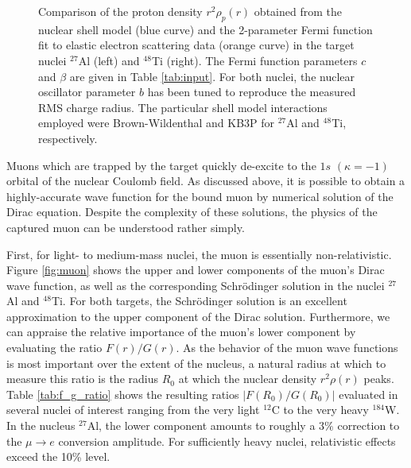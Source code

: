 \documentclass{book}[letterpaper,12pt]
\begin{document}
\begin{figure}
\centering
{}
\caption{Comparison of the proton density $r^2\rho_p(r)$ obtained from the nuclear shell model (blue curve) and the 2-parameter Fermi function fit to elastic electron scattering data (orange curve) in the target nuclei $^{27}$Al (left) and $^{48}$Ti (right). The Fermi function parameters $c$ and $\beta$ are given in Table \ref{tab:input}. For both nuclei, the nuclear oscillator parameter $b$ has been tuned to reproduce the measured RMS charge radius. The particular shell model interactions employed were Brown-Wildenthal and KB3P for $^{27}$Al and $^{48}$Ti, respectively.}
\end{figure}

Muons which are trapped by the target quickly de-excite to the $1s$ $(\kappa=-1)$ orbital of the nuclear Coulomb field. As discussed above, it is possible to obtain a highly-accurate wave function for the bound muon by numerical solution of the Dirac equation. Despite the complexity of these solutions, the physics of the captured muon can be understood rather simply. 

First, for light- to medium-mass nuclei, the muon is essentially non-relativistic. Figure \ref{fig:muon} shows the upper and lower components of the muon's Dirac wave function, as well as the corresponding Schr\"odinger solution in the nuclei $^{27}$Al and $^{48}$Ti. For both targets, the Schr\"odinger solution is an excellent approximation to the upper component of the Dirac solution. Furthermore, we can appraise the relative importance of the muon's lower component by evaluating the ratio $F(r)/G(r)$. As the behavior of the muon wave functions is most important over the extent of the nucleus, a natural radius at which to measure this ratio is the radius $R_0$ at which the nuclear density $r^2\rho(r)$ peaks. Table \ref{tab:f_g_ratio} shows the resulting ratios $|F(R_0)/G(R_0)|$ evaluated in several nuclei of interest ranging from the very light $^{12}$C to the very heavy $^{184}$W. In the nucleus $^{27}$Al, the lower component amounts to roughly a $3\%$ correction to the $\mu\rightarrow e$ conversion amplitude. For sufficiently heavy nuclei, relativistic effects exceed the 10\% level. 
\end{document}
